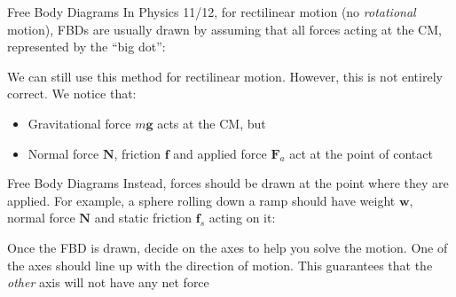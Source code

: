 \documentclass[12pt,compress,aspectratio=169]{beamer}
\begin{document}
\begin{frame}{Free Body Diagrams}
  In Physics 11/12, for rectilinear motion (no \emph{rotational} motion),
  FBDs are usually drawn by assuming that all forces acting at the CM,
  represented by the ``big dot'':
  \begin{center}
  \end{center}
  \vspace{-.1in}We can still use this method for rectilinear motion. However,
  this is not entirely correct. We notice that:
  \begin{itemize}
  \item Gravitational force $m\bm{g}$ acts at the CM, but
  \item Normal force $\bm{N}$, friction $\bm{f}$ and applied force $\bm{F}_a$
    act at the point of contact
  \end{itemize}
\end{frame}



\begin{frame}{Free Body Diagrams}
  Instead, forces should be drawn at the point where they are applied. For
  example, a sphere rolling down a ramp should have weight $\bm{w}$, normal
  force $\bm{N}$ and static friction $\bm{f}_s$ acting on it:
  \begin{center}
  \end{center}
  Once the FBD is drawn, decide on the axes to help you solve the motion. One of
  the axes should line up with the direction of motion. This guarantees that the 
  \emph{other} axis will not have any net force
\end{frame}
\end{document}
